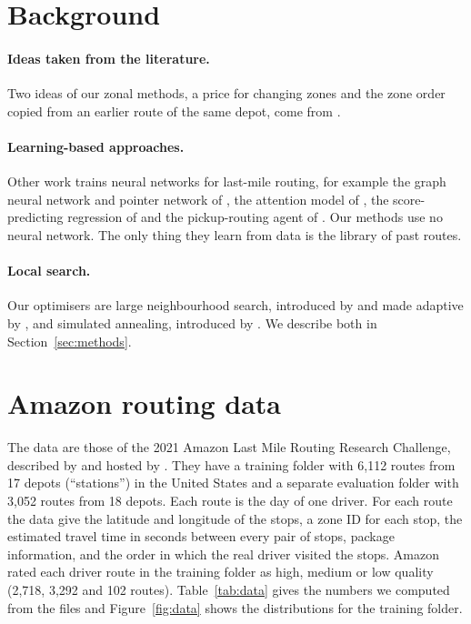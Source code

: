 \documentclass[11pt,a4paper]{article}
\newcommand{\mention}[1]{\citeauthor*{#1}}
\begin{document}
\section{Background}\label{sec:related}
\paragraph{Ideas taken from the literature.} Two ideas of our zonal methods, a price for changing zones and the zone order copied from an earlier route of the same depot, come from \mention{cook2022}.

\paragraph{Learning-based approaches.}
Other work trains neural networks for last-mile routing, for example the graph neural network and pointer network of \mention{ruizfas}, the attention model of \mention{kool2019}, the score-predicting regression of \mention{ozarik} and the pickup-routing agent of \mention{xu2026}. Our methods use no neural network. The only thing they learn from data is the library of past routes.

\paragraph{Local search.}
Our optimisers are large neighbourhood search, introduced by \mention{shaw1998} and made adaptive by \mention{ropke2006}, and simulated annealing, introduced by \mention{kirkpatrick1983}. We describe both in Section~\ref{sec:methods}.

\section{Amazon routing data}\label{sec:data}
The data are those of the 2021 Amazon Last Mile Routing Research Challenge, described by \mention{merchan2022} and hosted by \mention{challengeweb}. They have a training folder with 6,112 routes from 17 depots (``stations'') in the United States and a separate evaluation folder with 3,052 routes from 18 depots. Each route is the day of one driver. For each route the data give the latitude and longitude of the stops, a zone ID for each stop, the estimated travel time in seconds between every pair of stops, package information, and the order in which the real driver visited the stops. Amazon rated each driver route in the training folder as high, medium or low quality (2,718, 3,292 and 102 routes). Table~\ref{tab:data} gives the numbers we computed from the files and Figure~\ref{fig:data} shows the distributions for the training folder.
\end{document}
